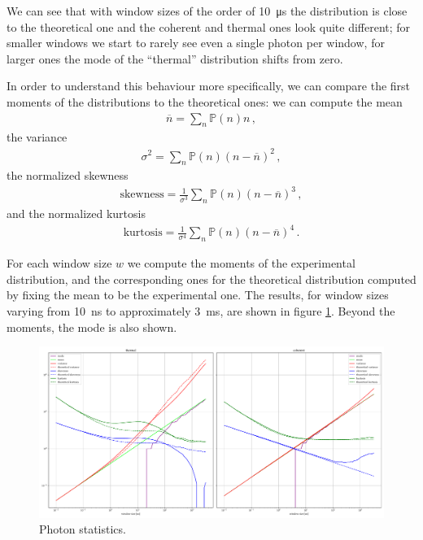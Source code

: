 \documentclass[main.tex]{subfiles}
\begin{document}
We can see that with window sizes of the order of \SI{10}{\micro s} the distribution is close to the theoretical one and the coherent and thermal ones look quite different; for smaller windows we start to rarely see even a single photon per window, for larger ones the mode of the ``thermal'' distribution shifts from zero.

In order to understand this behaviour more specifically, we can compare the first moments of the distributions to the theoretical ones: we can compute the mean
%
\begin{align}
\overline{n} = \sum _{n} \mathbb{P}(n) n
\,,
\end{align}
%
the variance 
%
\begin{align}
\sigma^2 = \sum _{n} \mathbb{P}(n) (n - \overline{n})^2
\,,
\end{align}
%
the normalized skewness 
%
\begin{align}
\text{skewness} = \frac{1}{\sigma^3} \sum _{n} \mathbb{P}(n) (n - \overline{n})^3
\,,
\end{align}
%
and the normalized kurtosis 
%
\begin{align}
\text{kurtosis} = \frac{1}{\sigma^4} \sum _{n} \mathbb{P}(n) (n - \overline{n})^4
\,.
\end{align}

For each window size \(w\) we compute the moments of the experimental distribution, and the corresponding ones for the theoretical distribution computed by fixing the mean to be the experimental one.
The results, for window sizes varying from \SI{10}{ns} to approximately \SI{3}{ms}, are shown in figure \ref{fig:photon_statistics}. Beyond the moments, the mode is also shown. 

\begin{figure}
    \includegraphics[width=\textwidth]{figures/photon_statistics.pdf}
    \caption{Photon statistics.}
    \label{fig:photon_statistics}
\end{figure}
\end{document}

